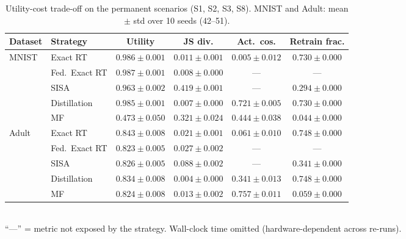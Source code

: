 \begin{table}[H]
\centering
\caption{Utility-cost trade-off on the permanent scenarios (S1, S2, S3, S8). MNIST and Adult: mean $\pm$ std over 10 seeds (42--51).}
\label{tab:tradeoff}
\small
\renewcommand{\arraystretch}{1.2}
\begin{tabular}{@{} l l c c c c @{}}
\toprule
\textbf{Dataset} & \textbf{Strategy} & \textbf{Utility} & \textbf{JS div.} & \textbf{Act.\ cos.} & \textbf{Retrain frac.} \\
\midrule
\multirow{5}{*}{MNIST} & Exact RT & $0.986 \pm 0.001$ & $0.011 \pm 0.001$ & $0.005 \pm 0.012$ & $0.730 \pm 0.000$ \\
 & Fed.\ Exact RT & $0.987 \pm 0.001$ & $0.008 \pm 0.000$ & --- & --- \\
 & SISA & $0.963 \pm 0.002$ & $0.419 \pm 0.001$ & --- & $0.294 \pm 0.000$ \\
 & Distillation & $0.985 \pm 0.001$ & $0.007 \pm 0.000$ & $0.721 \pm 0.005$ & $0.730 \pm 0.000$ \\
 & MF & $0.473 \pm 0.050$ & $0.321 \pm 0.024$ & $0.444 \pm 0.038$ & $0.044 \pm 0.000$ \\
\midrule
\multirow{5}{*}{Adult} & Exact RT & $0.843 \pm 0.008$ & $0.021 \pm 0.001$ & $0.061 \pm 0.010$ & $0.748 \pm 0.000$ \\
 & Fed.\ Exact RT & $0.823 \pm 0.005$ & $0.027 \pm 0.002$ & --- & --- \\
 & SISA & $0.826 \pm 0.005$ & $0.088 \pm 0.002$ & --- & $0.341 \pm 0.000$ \\
 & Distillation & $0.834 \pm 0.008$ & $0.004 \pm 0.000$ & $0.341 \pm 0.013$ & $0.748 \pm 0.000$ \\
 & MF & $0.824 \pm 0.008$ & $0.013 \pm 0.002$ & $0.757 \pm 0.011$ & $0.059 \pm 0.000$ \\
\midrule
\bottomrule
\end{tabular}
\\[2pt]
{\footnotesize ``---'' = metric not exposed by the strategy. Wall-clock time omitted (hardware-dependent across re-runs).}
\end{table}
